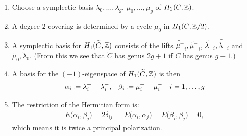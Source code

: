 \begin{frame}
    

\begin{enumerate}[<+->]
	\item Choose a symplectic basis $\lambda_0, \ldots, \lambda_g$, $\mu_0, \ldots, \mu_g$ of $H_1(C,\mathbb{Z})$.

	\item A degree $2$ covering is determined by a cycle $\mu_0$ in $H_1(C, \mathbb{Z}/2)$.

	\item A symplectic basis for $H_1(\widetilde C, \mathbb{Z})$ consists of the lifts $\widetilde{\mu^+}_i, \widetilde{\mu^-}_i$, $\widetilde{\lambda^-}_i, \widetilde{\lambda^+}_i$ and $\widetilde{\mu}_0, \widetilde{\lambda}_0$. (From this we see that $\widetilde C$ has genus $2g+1$ if $C$ has genus $g-1$.)

	\item A basis for the $(-1)$-eigenspace of $H_1(\widetilde C,\mathbb{Z})$ is then
	\begin{align*}
	\alpha_i \coloneqq \lambda_i^+ - \lambda_i^-, && \beta_i \coloneqq \mu_i^+ - \mu_i^- && i=1,\ldots, g
	\end{align*}

	\item The restriction of the Hermitian form is:
	\begin{align*}
	E\big(\alpha_i,\beta_j\big)= 2 \delta_{ij} && E\big(\alpha_i, \alpha_j\big) = E\big(\beta_i,\beta_j\big)=0,
	\end{align*}
	which means it is twice a principal polarization.
\end{enumerate}


\end{frame}